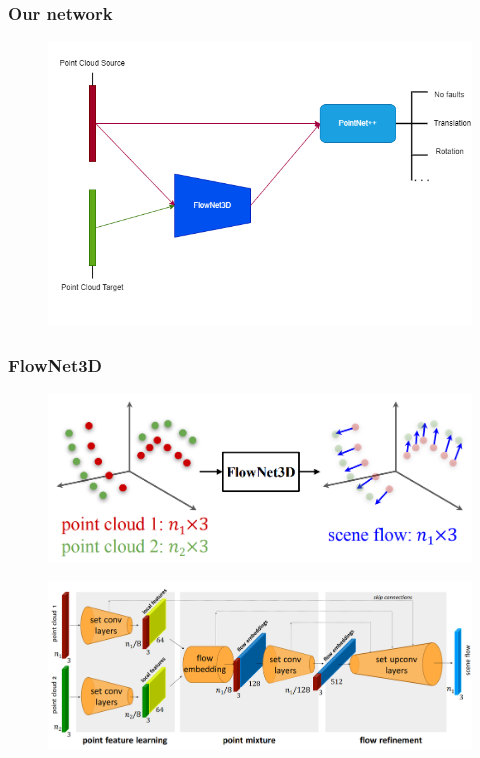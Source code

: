 \documentclass{beamer}
\begin{document}
\begin{frame}[t,allowframebreaks]
    \frametitle{Our network}
    \begin{figure}
        \centering
        \includegraphics[scale=0.35]{img/05_OurNetwork.png}
        \label{fig:enter-label}
    \end{figure}
\end{frame}
\begin{frame}[t,allowframebreaks]
    \frametitle{FlowNet3D}
    \begin{figure}
        \centering
        \includegraphics[width=\textwidth,height=0.8\textheight,keepaspectratio]{img/05_Flow3D.png}
        \label{fig:enter-label}
    \end{figure}
    \begin{figure}
        \centering
        \includegraphics[width=\textwidth,height=0.8\textheight,keepaspectratio]{img/05_FlowNet3D.png}
        \label{fig:enter-label}
    \end{figure}
\end{frame}
\end{document}
